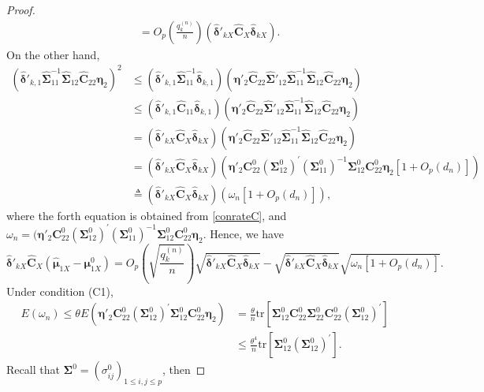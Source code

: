 \documentclass[12pt]{article}
\begin{document}
\begin{proof}{}{}
\begin{align*}
&= O_p(\frac{q_k^{(n)}}{n})(\hat{\bm \delta}'_{kX} \hat{\bm C}_X \hat{\bm \delta}_{kX}).
\end{align*}
On the other hand,
\begin{align*}
(\hat{\bm \delta}'_{k,1} \hat{\bm \Sigma}_{11}^{-1} \hat{\bm \Sigma}_{12} \hat{\bm C}_{22} \bm \eta_2)^2 &\leq (\hat{\bm \delta}'_{k,1} \hat{\bm \Sigma}_{11}^{-1} \hat{\bm \delta}_{k,1})(\bm \eta'_2 \hat{\bm C}_{22} \hat{\bm \Sigma}'_{12} \hat{\bm \Sigma}_{11}^{-1} \hat{\bm \Sigma}_{12} \hat{\bm C}_{22} \bm \eta_2) \\
&\leq (\hat{\bm \delta}'_{k,1} \hat{\bm C}_{11} \hat{\bm \delta}_{k,1}) (\bm \eta'_2 \hat{\bm C}_{22} \hat{\bm \Sigma}'_{12} \hat{\bm \Sigma}_{11}^{-1} \hat{\bm \Sigma}_{12} \hat{\bm C}_{22} \bm \eta_2) \\
&= (\hat{\bm \delta}'_{kX} \hat{\bm C}_X \hat{\bm \delta}_{kX})(\bm \eta'_2 \hat{\bm C}_{22} \hat{\bm \Sigma}'_{12} \hat{\bm \Sigma}_{11}^{-1} \hat{\bm \Sigma}_{12} \hat{\bm C}_{22} \bm \eta_2) \\
&= (\hat{\bm \delta}'_{kX} \hat{\bm C}_X \hat{\bm \delta}_{kX})(\bm \eta'_2 \bm C^0_{22} (\bm \Sigma^0_{12})^{'} (\bm \Sigma^0_{11})^{-1} \bm \Sigma^0_{12} \bm C^0_{22} \bm \eta_2 [1 + O_p(d_n)]) \\
& \triangleq (\hat{\bm \delta}'_{kX} \hat{\bm C}_X \hat{\bm \delta}_{kX})(\omega_n [1 + O_p(d_n)]),
\end{align*}
where the forth equation is obtained from \eqref{conrateC}, and $\omega_n = (\bm \eta'_2 \bm C^0_{22} (\bm \Sigma^0_{12})^{'} (\bm \Sigma^0_{11})^{-1} \bm \Sigma^0_{12} \bm C^0_{22} \bm \eta_2$.
Hence, we have
\begin{equation*}
\hat{\bm \delta}'_{kX} \hat{\bm C}_X (\hat{\bm \mu}_{1X} - \bm \mu_{1X}^0)
= O_p(\sqrt{\frac{q_k^{(n)}}{n}}) \sqrt{\hat{\bm \delta}'_{kX} \hat{\bm C}_X \hat{\bm \delta}_{kX}} - \sqrt{\hat{\bm \delta}'_{kX} \hat{\bm C}_X \hat{\bm \delta}_{kX}} \sqrt{\omega_n [1 + O_p(d_n)]}.
\end{equation*}
Under condition (C1),
\begin{align*}
E(\omega_n) \leq \theta E(\bm \eta'_2 \bm C^0_{22} (\bm \Sigma^0_{12})^{'} \bm \Sigma^0_{12} \bm C^0_{22} \bm \eta_2)
&= \frac{\theta}{n} \mbox{tr} [\bm \Sigma^0_{12} \bm C^0_{22} \bm \Sigma^0_{22} \bm C^0_{22} (\bm \Sigma^0_{12})^{'}]  \\
&\leq \frac{\theta^4}{n} \mbox{tr} [\bm \Sigma^0_{12} (\bm \Sigma^0_{12})^{'}].
\end{align*}
Recall that $\bm \Sigma^0 = (\sigma_{ij}^0)_{1 \leq i, j \leq p}$, then

\end{proof}
\end{document}
